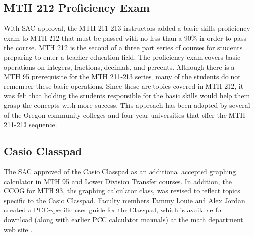 \subsection{MTH 212 Proficiency Exam}
With SAC approval, the MTH 211-213 instructors added a basic skills proficiency exam to MTH 212 that must be passed with no less than a 90\% in order to pass the course.  MTH 212 is the second of a three part series of courses for students preparing to enter a teacher education field. The proficiency exam covers basic operations on integers, fractions, decimals, and percents.  Although there is a MTH 95 prerequisite for the MTH 211-213 series, many of the students do not remember these basic operations. Since these are topics covered in MTH 212, it was felt that holding the students responsible for the basic skills would help them grasp the concepts with more success.  This approach has been adopted by several of the Oregon community colleges and four-year universities that offer the MTH 211-213 sequence.

\subsection{Casio Classpad}
The SAC approved of the Casio Classpad as an additional accepted graphing calculator in MTH 95 and Lower Division Transfer courses. In addition, the CCOG for MTH 93, the graphing calculator class, was revised to reflect topics specific to the Casio Classpad. Faculty members Tammy Louie and Alex Jordan created a PCC-specific user guide for the Classpad, which is available for download (along with earlier PCC calculator manuals) at the math department web site \cite{pccmathdept}. 
 
 



